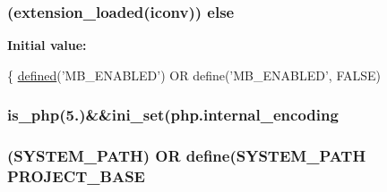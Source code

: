 \subsubsection[{else}]{ (extension\+\_\+loaded(\textquotesingle{}iconv\textquotesingle{})) else}\label{_admin_2tests_2_bootstrap_8php_a67773d041d277deb84668d80e4099034}
{\bfseries Initial value\+:}
\begin{DoxyCode}
\{
    \hyperlink{tests_2_bootstrap_8php_a46458e8654a714e0565e20f63021add9}{defined}(\textcolor{stringliteral}{'MB\_ENABLED'}) OR define('MB\_ENABLED', FALSE)
\end{DoxyCode}
\hypertarget{_admin_2tests_2_bootstrap_8php_acbea7ca989439eea4c6019ad3c5161aa}{}
\subsubsection[{is\+\_\+php}]{\setlength{\rightskip}{0pt plus 5cm}is\+\_\+php(\textquotesingle{}5.\textquotesingle{})\&\&ini\+\_\+set(\textquotesingle{}php.\+internal\+\_\+encoding\textquotesingle{}}\label{_admin_2tests_2_bootstrap_8php_acbea7ca989439eea4c6019ad3c5161aa}
\hypertarget{_admin_2tests_2_bootstrap_8php_a8731a5d504a6592ae43e07a048933c32}{}
\subsubsection[{P\+R\+O\+J\+E\+C\+T\+\_\+\+B\+A\+S\+E}]{ (\textquotesingle{}S\+Y\+S\+T\+E\+M\+\_\+\+P\+A\+T\+H\textquotesingle{}) O\+R define(\textquotesingle{}S\+Y\+S\+T\+E\+M\+\_\+\+P\+A\+T\+H\textquotesingle{} P\+R\+O\+J\+E\+C\+T\+\_\+\+B\+A\+S\+E}\label{_admin_2tests_2_bootstrap_8php_a8731a5d504a6592ae43e07a048933c32}
